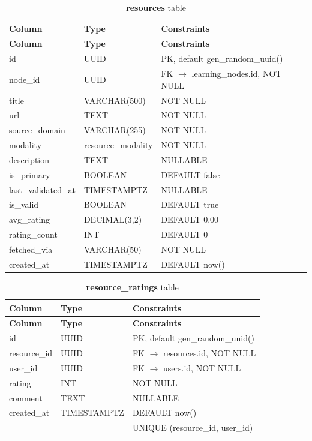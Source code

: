 \begin{longtable}{p{3cm}p{2.5cm}p{5cm}}
\caption{\textbf{resources} table}
\label{tab:ch04_resources}\\
\toprule
\textbf{Column} & \textbf{Type} & \textbf{Constraints} \\
\midrule
\endfirsthead
\toprule
\textbf{Column} & \textbf{Type} & \textbf{Constraints} \\
\midrule
\endhead
id & UUID & PK, default gen\_random\_uuid() \\
node\_id & UUID & FK $\rightarrow$ learning\_nodes.id, NOT NULL \\
title & VARCHAR(500) & NOT NULL \\
url & TEXT & NOT NULL \\
source\_domain & VARCHAR(255) & NOT NULL \\
modality & resource\_modality & NOT NULL \\
description & TEXT & NULLABLE \\
is\_primary & BOOLEAN & DEFAULT false \\
last\_validated\_at & TIMESTAMPTZ & NULLABLE \\
is\_valid & BOOLEAN & DEFAULT true \\
avg\_rating & DECIMAL(3,2) & DEFAULT 0.00 \\
rating\_count & INT & DEFAULT 0 \\
fetched\_via & VARCHAR(50) & NOT NULL \\
created\_at & TIMESTAMPTZ & DEFAULT now() \\
\bottomrule
\end{longtable}

\begin{longtable}{p{3cm}p{2.5cm}p{5cm}}
\caption{\textbf{resource\_ratings} table}
\label{tab:ch04_resource_ratings}\\
\toprule
\textbf{Column} & \textbf{Type} & \textbf{Constraints} \\
\midrule
\endfirsthead
\toprule
\textbf{Column} & \textbf{Type} & \textbf{Constraints} \\
\midrule
\endhead
id & UUID & PK, default gen\_random\_uuid() \\
resource\_id & UUID & FK $\rightarrow$ resources.id, NOT NULL \\
user\_id & UUID & FK $\rightarrow$ users.id, NOT NULL \\
rating & INT & NOT NULL \\
comment & TEXT & NULLABLE \\
created\_at & TIMESTAMPTZ & DEFAULT now() \\
 &  & UNIQUE (resource\_id, user\_id) \\
\bottomrule
\end{longtable}

